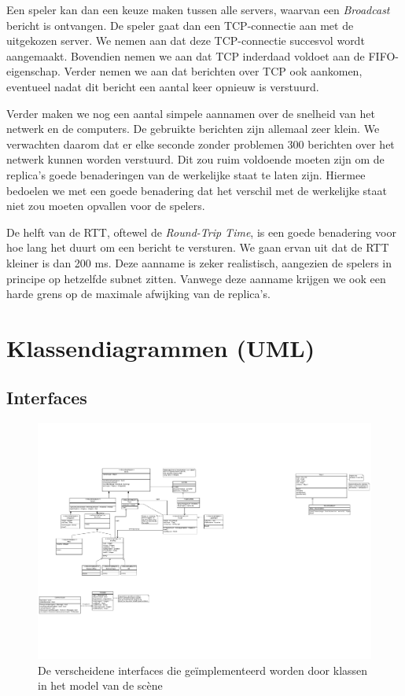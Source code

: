 \documentclass[a4paper,11pt]{article}
\begin{document}
    Een speler kan dan een keuze maken tussen alle servers, waarvan een \emph{Broadcast} bericht is ontvangen. De speler gaat dan een TCP-connectie aan met de uitgekozen server. We nemen aan dat deze TCP-connectie succesvol wordt aangemaakt. Bovendien nemen we aan dat TCP inderdaad voldoet aan de FIFO-eigenschap. Verder nemen we aan dat berichten over TCP ook aankomen, eventueel nadat dit bericht een aantal keer opnieuw is verstuurd.

    Verder maken we nog een aantal simpele aannamen over de snelheid van het netwerk en de computers. De gebruikte berichten zijn allemaal zeer klein. We verwachten daarom dat er elke seconde zonder problemen 300 berichten over het netwerk kunnen worden verstuurd. Dit zou ruim voldoende moeten zijn om de replica's goede benaderingen van de werkelijke staat te laten zijn. Hiermee bedoelen we met een goede benadering dat het verschil met de werkelijke staat niet zou moeten opvallen voor de spelers.

    De helft van de RTT, oftewel de \emph{Round-Trip Time}, is een goede benadering voor hoe lang het duurt om een bericht te versturen. We gaan ervan uit dat de RTT kleiner is dan 200 ms. Deze aanname is zeker realistisch, aangezien de spelers in principe op hetzelfde subnet zitten. Vanwege deze aanname krijgen we ook een harde grens op de maximale afwijking van de replica's.

    \label{sec:interactscenmodel}
    \newpage
    \appendix
    \section{Klassendiagrammen (UML)}
    \subsection{Interfaces}
    \begin{figure}[h]
    \centering
    	\includegraphics{../Class-diagram/Interfaces.pdf}
    	\caption{De verscheidene interfaces die ge\"implementeerd worden door klassen in het model van de sc\`ene}
    \end{figure}
    \label{app:Interfaces}
    \FloatBarrier
\end{document}
